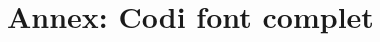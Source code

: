 \section{Annex: Codi font complet}

\inputminted[linenos, frame=lines, fontsize=\footnotesize]{vbnet}{../palet.MB4}